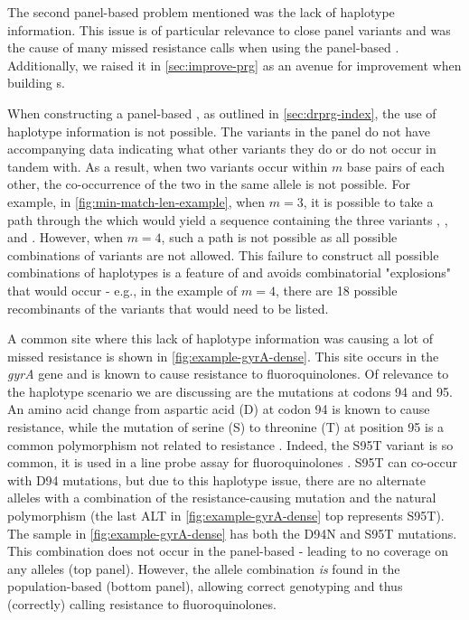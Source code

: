 The second panel-based \prg{} problem mentioned was the lack of haplotype information. This issue is of particular relevance to close panel variants and was the cause of many missed resistance calls when using the panel-based \prg{}. Additionally, we raised it in \autoref{sec:improve-prg} as an avenue for improvement when building \prg{}s.

When constructing a panel-based \prg{}, as outlined in \autoref{sec:drprg-index}, the use of haplotype information is not possible. The variants in the panel do not have accompanying data indicating what other variants they do or do not occur in tandem with. As a result, when two variants occur within $m$ base pairs of each other, the co-occurrence of the two in the same allele is not possible. For example, in \autoref{fig:min-match-len-example}, when $m=3$, it is possible to take a path through the \prg{} which would yield a sequence containing the three variants , , and . However, when $m=4$, such a path is not possible as all possible combinations of variants are not allowed. This failure to construct all possible combinations of haplotypes is a feature of \makeprg{} and avoids combinatorial "explosions" that would occur - e.g., in the example of $m=4$, there are 18 possible recombinants of the variants that would need to be listed.

A common site where this lack of haplotype information was causing a lot of missed resistance is shown in \autoref{fig:example-gyrA-dense}. This site occurs in the \textit{gyrA} gene and is known to cause resistance to fluoroquinolones. Of relevance to the haplotype scenario we are discussing are the mutations at codons 94 and 95. An amino acid change from aspartic acid (D) at codon 94 is known to cause resistance, while the mutation of serine (S) to threonine (T) at position 95 is a common polymorphism not related to resistance \cite{sreevatsan1997,Giannoni2005,singhal2016}. Indeed, the S95T variant is so common, it is used in a line probe assay for fluoroquinolones \cite{Giannoni2005}. S95T can co-occur with D94 mutations, but due to this haplotype issue, there are no alternate alleles with a combination of the resistance-causing mutation and the natural polymorphism (the last ALT in \autoref{fig:example-gyrA-dense} top represents S95T). The sample in \autoref{fig:example-gyrA-dense} has both the D94N and S95T mutations. This combination does not occur in the panel-based \prg{} - leading to no coverage on any alleles (top panel). However, the allele combination \emph{is} found in the population-based \prg{} (bottom panel), allowing correct genotyping and thus (correctly) calling resistance to fluoroquinolones.

